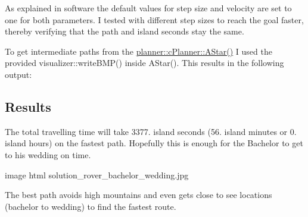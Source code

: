 As explained in software the default values for step size and velocity are set to one for both parameters. I tested with different step sizes to reach the goal faster, thereby verifying that the path and island seconds stay the same.

To get intermediate paths from the \mbox{\hyperlink{classplanner_1_1c_planner_a341e70531266f023ac9461d18979d1ef}{planner\+::c\+Planner\+::\+A\+Star()}} I used the provided visualizer\+::write\+B\+M\+P() inside A\+Star(). This results in the following output\+:

\subsection*{Results}

The total travelling time will take 3377. island seconds (56. island minutes or 0. island hours) on the fastest path. Hopefully this is enough for the Bachelor to get to his wedding on time.

image html solution\+\_\+rover\+\_\+bachelor\+\_\+wedding.\+jpg



The best path avoids high mountains and even gets close to see locations (bachelor to wedding) to find the fastest route.


